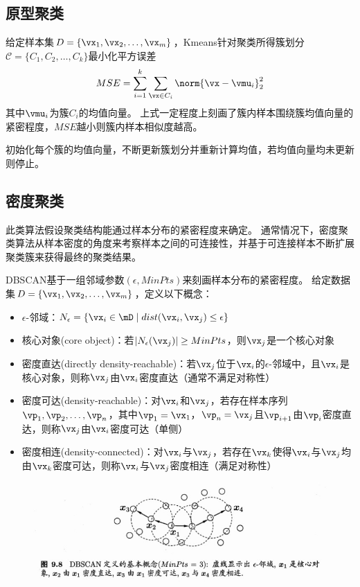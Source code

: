\subsection{原型聚类}
给定样本集$D=\{\vx_1,\vx_2,\ldots,\vx_m\}$，Kmeans针对聚类所得簇划分$\mathcal{C}=\{C_1,C_2,\ldots,C_k\}$最小化平方误差
\[MSE=\sum_{i=1}^k\sum_{\vx\in C_i}\norm{\vx-\vmu_i}_2^2\]
其中$\vmu_i$为簇$C_i$的均值向量。
上式一定程度上刻画了簇内样本围绕簇均值向量的紧密程度，$MSE$越小则簇内样本相似度越高。

初始化每个簇的均值向量，不断更新簇划分并重新计算均值，若均值向量均未更新则停止。

\subsection{密度聚类}
此类算法假设聚类结构能通过样本分布的紧密程度来确定。
通常情况下，密度聚类算法从样本密度的角度来考察样本之间的可连接性，并基于可连接样本不断扩展聚类簇来获得最终的聚类结果。

DBSCAN基于一组邻域参数$(\epsilon,MinPts)$来刻画样本分布的紧密程度。
给定数据集$D=\{\vx_1,\vx_2,\ldots,\vx_m\}$，定义以下概念：
\begin{itemize}
	\item $\epsilon$-邻域：$N_{\epsilon}=\{\vx_i\in\mD\mid dist(\vx_i,\vx_j)\leq\epsilon\}$
	\item 核心对象(core object)：若$|N_{\epsilon}(\vx_j)|\geq MinPts$，则$\vx_j$是一个核心对象
	\item 密度直达(directly density-reachable)：若$\vx_j$位于$\vx_i$的$\epsilon$-邻域中，且$\vx_i$是核心对象，则称$\vx_j$由$\vx_i$密度直达（通常不满足对称性）
	\item 密度可达(density-reachable)：对$\vx_i$和$\vx_j$，若存在样本序列$\vp_1,\vp_2,\ldots,\vp_n$，其中$\vp_1=\vx_1$，$\vp_n=\vx_j$且$\vp_{i+1}$由$\vp_i$密度直达，则称$\vx_j$由$\vx_i$密度可达（单侧）
	\item 密度相连(density-connected)：对$\vx_i$与$\vx_j$，若存在$\vx_k$使得$\vx_i$与$\vx_j$均由$\vx_k$密度可达，则称$\vx_i$与$\vx_j$密度相连（满足对称性）
\end{itemize}
\begin{figure}[H]
\centering
\includegraphics[width=0.8\linewidth]{fig/DBSCAN.jpg}
\end{figure}

